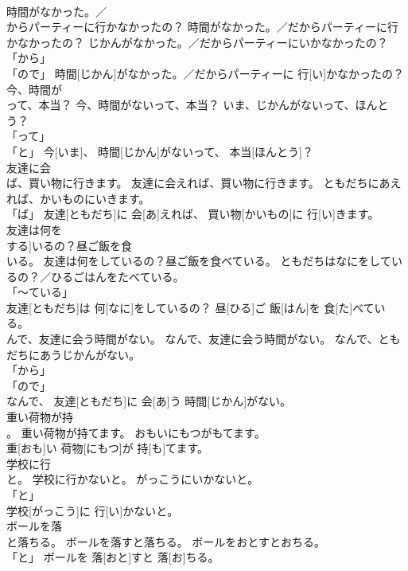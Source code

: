 \documentclass[8pt]{extreport}
\begin{document}
\begin{CJK}{UTF8}{min}
\\	時間がなかった。／
\\	からパーティーに行かなかったの？	時間がなかった。／だからパーティーに行かなかったの？	じかんがなかった。／だからパーティーにいかなかったの？	
\\	「から」 
\\	「ので」	時間[じかん]がなかった。／だからパーティーに 行[い]かなかったの？		
\\	今、時間が
\\	って、本当？	今、時間がないって、本当？	いま、じかんがないって、ほんとう？	
\\	「って」 
\\	「と」	今[いま]、 時間[じかん]がないって、 本当[ほんとう]？		
\\	友達に会
\\	ば、買い物に行きます。	友達に会えれば、買い物に行きます。	ともだちにあえれば、かいものにいきます。	
\\	「ば」	友達[ともだち]に 会[あ]えれば、 買い物[かいもの]に 行[い]きます。		
\\	友達は何を
\\	する]いるの？昼ご飯を食
\\	いる。	友達は何をしているの？昼ご飯を食べている。	ともだちはなにをしているの？／ひるごはんをたべている。	
\\	「～ている」 
\\	友達[ともだち]は 何[なに]をしているの？ 昼[ひる]ご 飯[はん]を 食[た]べている。		
\\	んで、友達に会う時間がない。	なんで、友達に会う時間がない。	なんで、ともだちにあうじかんがない。	
\\	「から」 
\\	「ので」 
\\	なんで、 友達[ともだち]に 会[あ]う 時間[じかん]がない。		
\\	重い荷物が持
\\	。	重い荷物が持てます。	おもいにもつがもてます。	
\\	重[おも]い 荷物[にもつ]が 持[も]てます。		
\\	学校に行
\\	と。	学校に行かないと。	がっこうにいかないと。	
\\	「と」
\\	学校[がっこう]に 行[い]かないと。		
\\	ボールを落
\\	と落ちる。	ボールを落すと落ちる。	ボールをおとすとおちる。	
\\	「と」	ボールを 落[おと]すと 落[お]ちる。		

\end{CJK}
\end{document}
